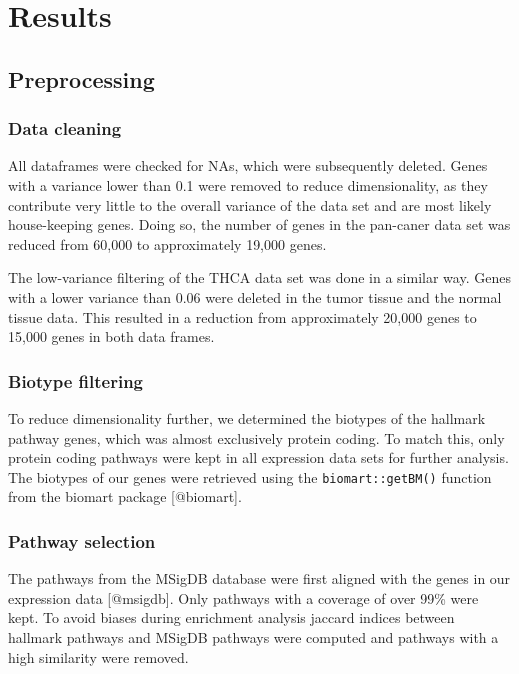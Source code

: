 \documentclass[
]{article}
\author{}
\date{\vspace{-2.5em}}
\begin{document}
\hypertarget{results}{%
\section{Results}\label{results}}

\hypertarget{preprocessing}{%
\subsection{Preprocessing}\label{preprocessing}}

\hypertarget{data-cleaning}{%
\subsubsection{Data cleaning}\label{data-cleaning}}

All dataframes were checked for NAs, which were subsequently deleted.
Genes with a variance lower than 0.1 were removed to reduce
dimensionality, as they contribute very little to the overall variance
of the data set and are most likely house-keeping genes. Doing so, the
number of genes in the pan-caner data set was reduced from 60,000 to
approximately 19,000 genes.

The low-variance filtering of the THCA data set was done in a similar
way. Genes with a lower variance than 0.06 were deleted in the tumor
tissue and the normal tissue data. This resulted in a reduction from
approximately 20,000 genes to 15,000 genes in both data frames.

\hypertarget{biotype-filtering}{%
\subsubsection{Biotype filtering}\label{biotype-filtering}}

To reduce dimensionality further, we determined the biotypes of the
hallmark pathway genes, which was almost exclusively protein coding. To
match this, only protein coding pathways were kept in all expression
data sets for further analysis. The biotypes of our genes were retrieved
using the \texttt{biomart::getBM()} function from the biomart package
{[}@biomart{]}.

\hypertarget{pathway-selection}{%
\subsubsection{Pathway selection}\label{pathway-selection}}

The pathways from the MSigDB database were first aligned with the genes
in our expression data {[}@msigdb{]}. Only pathways with a coverage of
over 99\% were kept. To avoid biases during enrichment analysis jaccard
indices between hallmark pathways and MSigDB pathways were computed and
pathways with a high similarity were removed.
\end{document}

